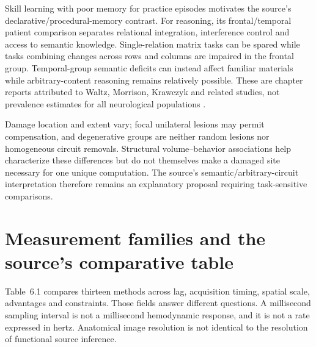 Skill learning with poor memory for practice episodes motivates
the source's declarative/procedural-memory contrast. For reasoning,
its frontal/temporal patient comparison separates relational integration,
interference control and access to semantic knowledge. Single-relation
matrix tasks can be spared while tasks combining changes across
rows and columns are impaired in the frontal group. Temporal-group
semantic deficits can instead affect familiar materials while
arbitrary-content reasoning remains relatively possible. These are
chapter reports attributed to Waltz, Morrison, Krawczyk and related
studies, not prevalence estimates for all neurological populations
\cite[pp.~68, 72--73]{MorrisonKnowlton2012Methods}.

Damage location and extent vary; focal unilateral lesions may
permit compensation, and degenerative groups are neither random
lesions nor homogeneous circuit removals. Structural volume--behavior
associations help characterize these differences but do not themselves
make a damaged site necessary for one unique computation. The
source's semantic/arbitrary-circuit interpretation therefore remains
an explanatory proposal requiring task-sensitive comparisons.

\section{Measurement families and the source's comparative table}
\label{sec:p19-ncm-measurements}

Table~6.1 compares thirteen methods across lag, acquisition timing,
spatial scale, advantages and constraints. Those fields answer
different questions. A millisecond sampling interval is not a
millisecond hemodynamic response, and it is not a rate expressed
in hertz. Anatomical image resolution is not identical to the
resolution of functional source inference.

